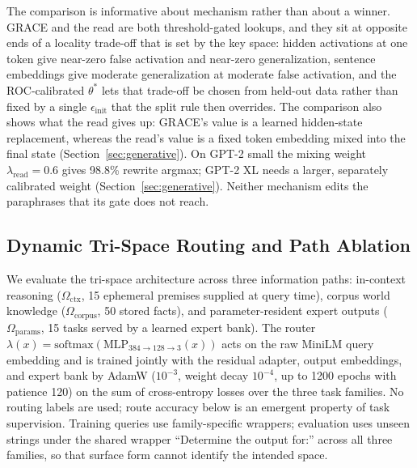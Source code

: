 \documentclass[preprint,12pt]{elsarticle}
\newcommand{\Om}{\Omega}
\begin{document}
The comparison is informative about mechanism rather than about a winner. GRACE and the read are both threshold-gated lookups, and they sit at opposite ends of a locality trade-off that is set by the key space: hidden activations at one token give near-zero false activation and near-zero generalization, sentence embeddings give moderate generalization at moderate false activation, and the ROC-calibrated $\theta^*$ lets that trade-off be chosen from held-out data rather than fixed by a single $\epsilon_{\mathrm{init}}$ that the split rule then overrides. The comparison also shows what the read gives up: GRACE's value is a learned hidden-state replacement, whereas the read's value is a fixed token embedding mixed into the final state (Section~\ref{sec:generative}). On GPT-2 small the mixing weight $\lambda_{\mathrm{read}}=0.6$ gives 98.8\% rewrite argmax; GPT-2 XL needs a larger, separately calibrated weight (Section~\ref{sec:generative}). Neither mechanism edits the paraphrases that its gate does not reach.

\subsection{Dynamic Tri-Space Routing and Path Ablation}
\label{sec:trigating}

We evaluate the tri-space architecture across three information paths: in-context reasoning ($\Om_{\mathrm{ctx}}$, 15 ephemeral premises supplied at query time), corpus world knowledge ($\Om_{\mathrm{corpus}}$, 50 stored facts), and parameter-resident expert outputs ($\Om_{\mathrm{params}}$, 15 tasks served by a learned expert bank). The router $\lambda(x)=\mathrm{softmax}(\mathrm{MLP}_{384\to128\to3}(x))$ acts on the raw MiniLM query embedding and is trained jointly with the residual adapter, output embeddings, and expert bank by AdamW ($10^{-3}$, weight decay $10^{-4}$, up to 1200 epochs with patience 120) on the sum of cross-entropy losses over the three task families. No routing labels are used; route accuracy below is an emergent property of task supervision. Training queries use family-specific wrappers; evaluation uses unseen strings under the shared wrapper ``Determine the output for:'' across all three families, so that surface form cannot identify the intended space.
\end{document}
